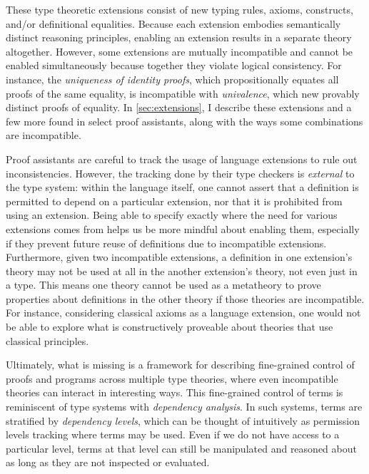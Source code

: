 \documentclass{article}
\begin{document}
These type theoretic extensions consist of new typing rules,
axioms, constructs, and/or definitional equalities.
Because each extension embodies semantically distinct reasoning principles,
enabling an extension results in a separate theory altogether.
However, some extensions are mutually incompatible and cannot be enabled simultaneously
because together they violate logical consistency.
For instance, the \emph{uniqueness of identity proofs},
which propositionally equates all proofs of the same equality,
is incompatible with \emph{univalence},
which new provably distinct proofs of equality.
In \cref{sec:extensions},
I describe these extensions and a few more found in select proof assistants,
along with the ways some combinations are incompatible.

Proof assistants are careful to track
the usage of language extensions to rule out inconsistencies.
However, the tracking done by their type checkers is \emph{external} to the type system:
within the language itself,
one cannot assert that a definition is permitted to depend on a particular extension,
nor that it is prohibited from using an extension.
Being able to specify exactly where the need for various extensions comes from
helps us be more mindful about enabling them,
especially if they prevent future reuse of definitions due to incompatible extensions.
Furthermore, given two incompatible extensions,
a definition in one extension's theory may not be used at all
in the another extension's theory, not even just in a type.
This means one theory cannot be used as a metatheory
to prove properties about definitions in the other theory
if those theories are incompatible.
For instance, considering classical axioms as a language extension,
one would not be able to explore what is constructively proveable
about theories that use classical principles.

Ultimately, what is missing is a framework for describing
fine-grained control of proofs and programs across multiple type theories,
where even incompatible theories can interact in interesting ways.
This fine-grained control of terms is reminiscent of
type systems with \emph{dependency analysis}.
In such systems, terms are stratified by \emph{dependency levels},
which can be thought of intuitively as permission levels tracking where terms may be used.
Even if we do not have access to a particular level,
terms at that level can still be manipulated and reasoned about
as long as they are not inspected or evaluated.
\end{document}

